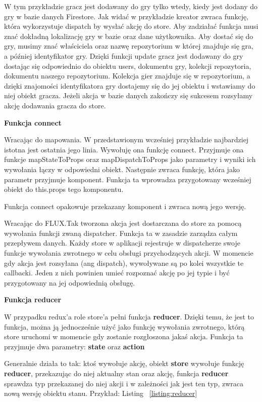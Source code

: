 W tym przykładzie gracz jest dodawany do gry tylko wtedy,
kiedy jest dodany do gry w bazie danych Firestore.
Jak widać w przykładzie kreator zwraca funkcję,
która wykorzystuje dispatch by wysłać akcję do store.
Aby zadziałać funkcja musi znać dokładną lokalizację gry w bazie oraz dane użytkownika.
Aby dostać się do gry, musimy znać właściciela oraz nazwę repozytorium w której znajduje się gra,
a później identyfikator gry.
Dzięki funkcji update gracz jest dodawany do gry dostając się odpowiednio do obiektu users,
dokumentu gry, kolekcji repozytoria, dokumentu naszego repozytorium.
Kolekcja gier znajduje się w repozytorium, a dzięki znajomości identyfikatora gry dostajemy się do jej obiektu i wstawiamy do niej obiekt gracza.
Jeżeli akcja w bazie danych zakończy się sukcesem rozsyłamy akcję dodawania gracza do store.
\begin{center}
	\textbf{Funkcja connect}
\end{center}
Wracając do mapowania. W przedstawionym wcześniej przykładzie najbardziej istotna jest ostatnia jego linia.
Wywołuję ona funkcję connect.
Przyjmuje ona funkcje mapStateToProps oraz mapDispatchToProps jako parametry i wyniki ich wywołania łączy w odpowiedni obiekt.
Następnie zwraca funkcję, która jako parametr przyjmuje komponent. Funkcja ta wprowadza przygotowany wcześniej obiekt do this.props tego komponentu.

Funkcja connect opakowuje przekazany komponent i zwraca nową jego wersję.

Wracając do FLUX.\@ Tak tworzona akcja jest dostarczana do store za pomocą wywołania funkcji zwaną dispatcher.
Funkcja ta w zasadzie zarządza całym przepływem danych.
Każdy store w aplikacji rejestruje w dispatcherze swoje funkcje wywołania zwrotnego w celu obsługi przychodzących akcji.
W momencie gdy akcja jest rozsyłana (ang dispatch), wywoływane są po kolei wszystkie te callbacki.
Jeden z nich powinien umieć rozpoznać akcję po jej typie i być przygotowany na jej odpowiednią obsługę.

\begin{center}
	\textbf{Funkcja reducer}
\end{center}

W przypadku redux'a role store'a pełni funkcja \textbf{reducer}. Dzięki temu, że jest to funkcja,
można ją jednocześnie użyć jako funkcję wywołania zwrotnego,
którą store uruchomi w momencie gdy zostanie rozgłoszona jakaś akcja.
Funkcja ta przyjmuje dwa parametry: \textbf{state} oraz \textbf{action}

Generalnie działa to tak: ktoś wywołuje akcję, obiekt \textbf{store} wywołuje funkcję \textbf{reducer},
przekazując do niej aktualny stan oraz akcję, funkcja \textbf{reducer}
sprawdza typ przekazanej do niej akcji i w zależności jak jest ten typ, zwraca nową wersję obiektu stanu.
Przykład: Listing
~\ref{listing:reducer}

